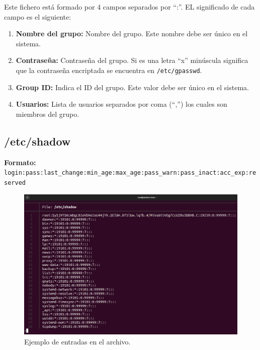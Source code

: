 \documentclass{article}
\begin{document}
\bigskip

Este fichero está formado por 4 campos separados por ``:''. EL significado de cada campo es el siguiente:

\begin{enumerate}
    \item \textbf{Nombre del grupo: }Nombre del grupo. Este nombre debe ser único en el sistema.
    
    \item \textbf{Contraseña: }Contraseña del grupo. Si es una letra ``x'' minúscula significa que la contraseña encriptada se encuentra en \verb|/etc/gpasswd|.
    \item \textbf{Group ID: }Indica el ID del grupo. Este valor debe ser único en el sistema.
    \item \textbf{Usuarios: }Lista de usuarios separados por coma (``,'') los cuales son miembros del grupo. 
\end{enumerate}

\newpage

\subsection*{/etc/shadow}
\textbf{Formato: }\verb|login:pass:last_change:min_age:max_age:pass_warn:pass_inact:acc_exp:reserved|

\begin{figure}[H]
    \includegraphics[width=\textwidth]{imagenes/shadowfile.png}
    \caption{Ejemplo de entradas en el archivo.}    
\end{figure}

\bigskip
\end{document}

